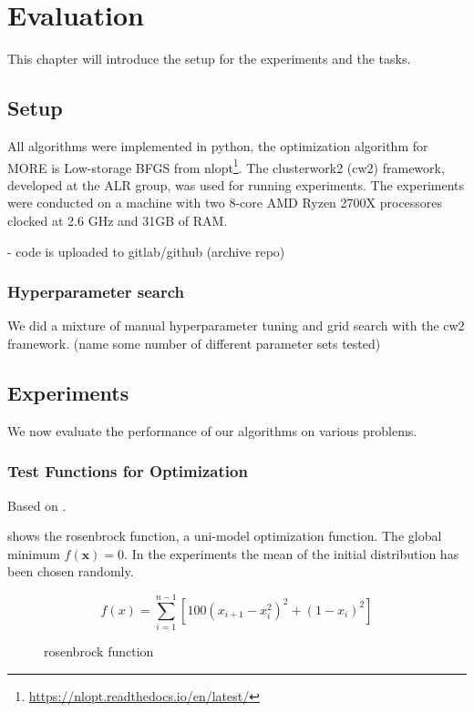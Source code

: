 
\chapter{Evaluation}
This chapter will introduce the setup for the experiments and the tasks.

\section{Setup}
All algorithms were implemented in python,
the optimization algorithm for MORE is Low-storage BFGS
from nlopt\footnote{\href{https://nlopt.readthedocs.io/en/latest/}{https://nlopt.readthedocs.io/en/latest/}}.
The clusterwork2 (cw2) framework, developed at the ALR group, was used for running experiments.
The experiments were conducted on a machine with two 8-core
AMD Ryzen 2700X processores clocked at 2.6 GHz and 31GB of RAM.

- code is uploaded to gitlab/github (archive repo)

\subsection{Hyperparameter search}
We did a mixture of manual hyperparameter tuning and grid search
with the cw2 framework. (name some number of different parameter
sets tested)

\section{Experiments}
We now evaluate the performance of our algorithms on various problems.

\subsection{Test Functions for Optimization}
Based on \citet{molga2005test}.

 shows the rosenbrock function, a uni-model optimization function. The global minimum $f(\mathbf{x}) = 0$. In the experiments
the mean of the initial distribution has been chosen randomly.

$$ f(x) = \sum^{n-1}_{i=1} [100(x_{i+1} - x_i^2)^2 + (1-x_i)^2] $$

\begin{figure}[ht!]
    \centering
    
    \caption{rosenbrock function}
    \label{fig:rosenbrock}
\end{figure}

